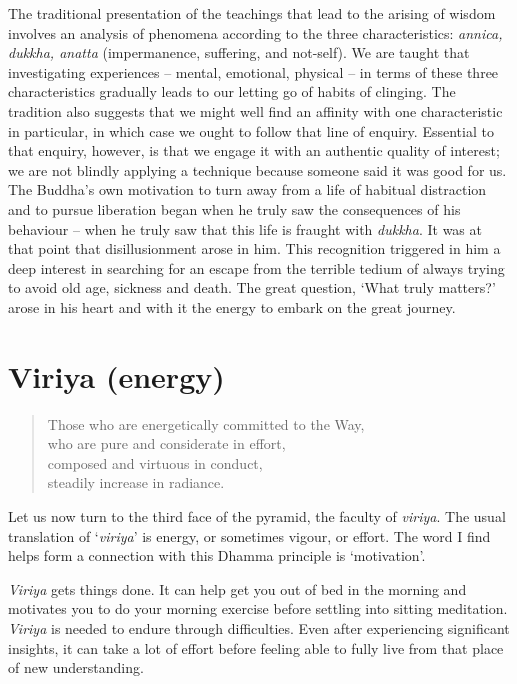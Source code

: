 The traditional presentation of the teachings that lead to the arising
of wisdom involves an analysis of phenomena according to the three
characteristics: \emph{annica, dukkha, anatta} (impermanence, suffering, and
not-self). We are taught that investigating experiences -- mental,
emotional, physical -- in terms of these three characteristics gradually
leads to our letting go of habits of clinging. The tradition also
suggests that we might well find an affinity with one characteristic in
particular, in which case we ought to follow that line of enquiry.
Essential to that enquiry, however, is that we engage it with an
authentic quality of interest; we are not blindly applying a technique
because someone said it was good for us. The Buddha's own motivation to
turn away from a life of habitual distraction and to pursue liberation
began when he truly saw the consequences of his behaviour -- when he
truly saw that this life is fraught with \emph{dukkha}. It was at that point
that disillusionment arose in him. This recognition triggered in him a
deep interest in searching for an escape from the terrible tedium of
always trying to avoid old age, sickness and death. The great question,
`What truly matters?' arose in his heart and with it the energy to
embark on the great journey.

\section{Viriya (energy)}

\begin{quote}
  Those who are energetically committed to the Way,\\
  who are pure and considerate in effort,\\
  composed and virtuous in conduct,\\
  steadily increase in radiance.

\end{quote}

Let us now turn to the third face of the pyramid, the faculty of
\emph{viriya}. The usual translation of `\emph{viriya}' is energy, or sometimes
vigour, or effort. The word I find helps form a connection with this
Dhamma principle is `motivation'.

\emph{Viriya} gets things done. It can help get you out of bed in the morning
and motivates you to do your morning exercise before settling into
sitting meditation. \emph{Viriya} is needed to endure through difficulties.
Even after experiencing significant insights, it can take a lot of
effort before feeling able to fully live from that place of new
understanding.

